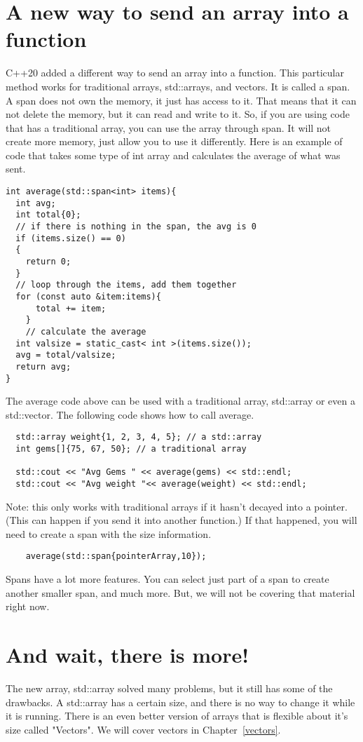 \section{A new way to send an array into a function}
C++20 added a different way to send an array into a function. This particular
method works for traditional arrays, std::arrays, and vectors. It is called
a span.
A span does not own the memory, it just has access to it. That means that
it can not delete the memory, but it can read and write to it. So, if
you are using code that has a traditional array, you can use the array
through span. It will not create more memory, just allow you to use it
differently. Here is an example of code that takes some type of int array
and calculates the average of what was sent.
\begin{lstlisting}
int average(std::span<int> items){
  int avg;
  int total{0};
  // if there is nothing in the span, the avg is 0
  if (items.size() == 0)
  {
    return 0;
  }
  // loop through the items, add them together
  for (const auto &item:items){
      total += item;
    }
    // calculate the average
  int valsize = static_cast< int >(items.size());
  avg = total/valsize;
  return avg;
}
\end{lstlisting}
The average code above can be used with a traditional array, std::array or even a 
std::vector. The following code shows how to call average.
\begin{lstlisting}
  std::array weight{1, 2, 3, 4, 5}; // a std::array
  int gems[]{75, 67, 50}; // a traditional array
 
  std::cout << "Avg Gems " << average(gems) << std::endl;
  std::cout << "Avg weight "<< average(weight) << std::endl;    
\end{lstlisting}
Note: this only works with traditional arrays if it hasn't decayed into a pointer.
(This can happen if you send it into another function.) If that happened, you will 
need to create a span with the size information.
\begin{lstlisting}
    average(std::span{pointerArray,10});
\end{lstlisting}
Spans have a lot more features. You can select just part of a span to create
another smaller span, and much more. But, we will not be covering that material
right now.
\section{And wait, there is more!}
The new array, std::array solved many problems, but it
still has some of the drawbacks. A std::array has a certain 
size, and there is no way to change it while it is running. There is an even better version of arrays that is flexible about it's size called "Vectors". We will cover vectors in Chapter~\ref{vectors}.